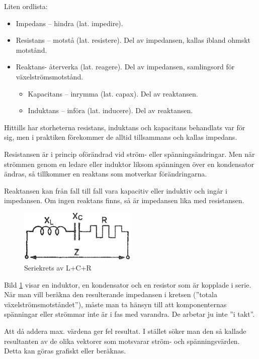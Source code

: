 Liten ordlista:
\begin{itemize}
\item Impedans -- hindra (lat. impedire).
\item Resistans -- motstå (lat. resistere).
  Del av impedansen, kallas ibland ohmskt motstånd.
\item Reaktans- återverka (lat. reagere).
  Del av impedansen, samlingsord för växelströmsmotstånd.
  \begin{itemize}
  \item Kapacitans -- inrymma (lat. capax). Del av reaktansen.
  \item Induktans -- införa (lat. inducere). Del av reaktansen.
  \end{itemize}
\end{itemize}

Hittills har storheterna resistans, induktans och kapacitans behandlats var för
sig, men i praktiken förekommer de alltid tillsammans och kallas impedans.

Resistansen är i princip oförändrad vid ström- eller spänningsändringar.
Men när strömmen genom en ledare eller induktor liksom spänningen över en
kondensator ändras, så tillkommer en reaktans som motverkar förändringarna.

Reaktansen kan från fall till fall vara kapacitiv eller induktiv och ingår i
impedansen.
Om ingen reaktans finns, så är impedansen lika med resistansen.

\begin{figure}
\includegraphics[width=0.5\textwidth]{images/cropped_pdfs/bild_2_3-12.pdf}
\caption{Seriekrets av L+C+R}
\label{fig:BildII3-12}
\end{figure}

Bild \ref{fig:BildII3-12} visar en induktor, en kondensator och en resistor
som är kopplade i serie.
När man vill beräkna den resulterande impedansen i kretsen
(''totala växelströmsmotståndet''), måste man ta hänsyn till att komponenternas
spänningar eller strömmar inte är i fas med varandra.
De arbetar ju inte ''i takt''.

Att då addera max. värdena ger fel resultat.
I stället söker man den så kallade resultanten av de olika vektorer som
motsvarar ström- och spänningsvärden.
Detta kan göras grafiskt eller beräknas.

